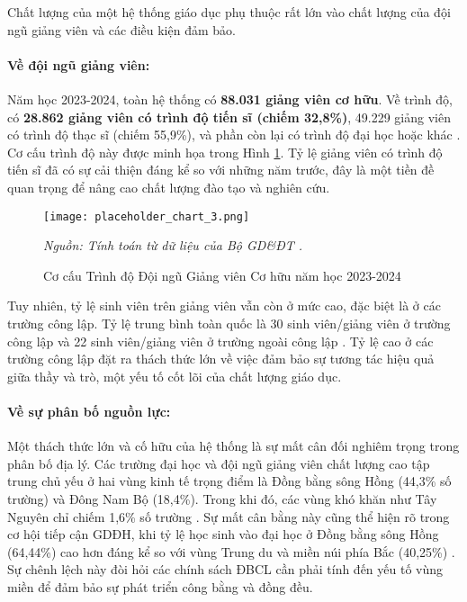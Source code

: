 \documentclass[12pt, a4paper, openany]{report}
\begin{document}
Chất lượng của một hệ thống giáo dục phụ thuộc rất lớn vào chất lượng của đội ngũ giảng viên và các điều kiện đảm bảo.

\paragraph{Về đội ngũ giảng viên:}
Năm học 2023-2024, toàn hệ thống có \textbf{88.031 giảng viên cơ hữu}. Về trình độ, có \textbf{28.862 giảng viên có trình độ tiến sĩ (chiếm 32,8\%)}, 49.229 giảng viên có trình độ thạc sĩ (chiếm 55,9\%), và phần còn lại có trình độ đại học hoặc khác \cite{stat_moet_2024}. Cơ cấu trình độ này được minh họa trong Hình \ref{fig:co_cau_giang_vien}. Tỷ lệ giảng viên có trình độ tiến sĩ đã có sự cải thiện đáng kể so với những năm trước, đây là một tiền đề quan trọng để nâng cao chất lượng đào tạo và nghiên cứu.


\begin{figure}[h!]
    \centering
    \texttt{[image: placeholder\_chart\_3.png]}
    \caption{Cơ cấu Trình độ Đội ngũ Giảng viên Cơ hữu năm học 2023-2024}
    \label{fig:co_cau_giang_vien}
    \vspace{0.2cm}
    \footnotesize{\textit{Nguồn: Tính toán từ dữ liệu của Bộ GD\&ĐT \cite{stat_moet_2024}.}}
\end{figure}

Tuy nhiên, tỷ lệ sinh viên trên giảng viên vẫn còn ở mức cao, đặc biệt là ở các trường công lập. Tỷ lệ trung bình toàn quốc là 30 sinh viên/giảng viên ở trường công lập và 22 sinh viên/giảng viên ở trường ngoài công lập \cite{stat_moet_2024}. Tỷ lệ cao ở các trường công lập đặt ra thách thức lớn về việc đảm bảo sự tương tác hiệu quả giữa thầy và trò, một yếu tố cốt lõi của chất lượng giáo dục.

\paragraph{Về sự phân bố nguồn lực:}
Một thách thức lớn và cố hữu của hệ thống là sự mất cân đối nghiêm trọng trong phân bố địa lý. Các trường đại học và đội ngũ giảng viên chất lượng cao tập trung chủ yếu ở hai vùng kinh tế trọng điểm là Đồng bằng sông Hồng (44,3\% số trường) và Đông Nam Bộ (18,4\%). Trong khi đó, các vùng khó khăn như Tây Nguyên chỉ chiếm 1,6\% số trường \cite{stat_quy_mo_2015_2021, stat_phan_bo_dia_ly}. Sự mất cân bằng này cũng thể hiện rõ trong cơ hội tiếp cận GDĐH, khi tỷ lệ học sinh vào đại học ở Đồng bằng sông Hồng (64,44\%) cao hơn đáng kể so với vùng Trung du và miền núi phía Bắc (40,25\%) \cite{stat_ty_le_vao_dh_2023}. Sự chênh lệch này đòi hỏi các chính sách ĐBCL cần phải tính đến yếu tố vùng miền để đảm bảo sự phát triển công bằng và đồng đều.
\end{document}
